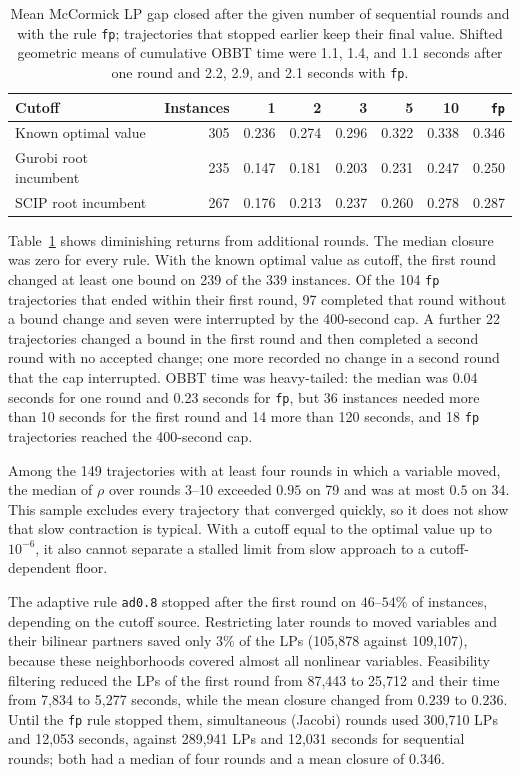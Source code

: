 \begin{table}[htbp]
\centering
\small
\begin{tabular}{@{}lrrrrrrr@{}}
\toprule
Cutoff & Instances & 1 & 2 & 3 & 5 & 10 & \texttt{fp}\\
\midrule
Known optimal value & 305 & 0.236 & 0.274 & 0.296 & 0.322 & 0.338 & 0.346\\
Gurobi root incumbent & 235 & 0.147 & 0.181 & 0.203 & 0.231 & 0.247 & 0.250\\
SCIP root incumbent & 267 & 0.176 & 0.213 & 0.237 & 0.260 & 0.278 & 0.287\\
\bottomrule
\end{tabular}
\caption{Mean McCormick LP gap closed after the given number of sequential
rounds and with the rule \texttt{fp}; trajectories that stopped earlier keep
their final value. Shifted geometric means of cumulative OBBT time were 1.1,
1.4, and 1.1 seconds after one round and 2.2, 2.9, and 2.1 seconds with
\texttt{fp}.}
\label{tab:precursor-rounds}
\end{table}

Table~\ref{tab:precursor-rounds} shows diminishing returns from additional
rounds. The median closure was zero for every rule. With the known optimal
value as cutoff, the first round changed at least one bound on 239 of the 339
instances. Of the 104 \texttt{fp} trajectories that ended within their first
round, 97 completed that round without a bound change and seven were
interrupted by the 400-second cap. A further 22 trajectories changed a bound in
the first round and then completed a second round with no accepted change; one
more recorded no change in a second round that the cap interrupted. OBBT time
was heavy-tailed: the median was 0.04 seconds for one round and 0.23 seconds for
\texttt{fp}, but 36 instances needed more than 10 seconds for the first round
and 14 more than 120 seconds, and 18 \texttt{fp} trajectories reached the
400-second cap.

Among the 149 trajectories with at least four rounds in which a variable moved,
the median of $\rho$ over rounds 3--10 exceeded $0.95$ on 79 and was at most $0.5$
on 34. This sample excludes every trajectory that converged quickly, so it does
not show that slow contraction is typical. With a cutoff equal to the optimal
value up to $10^{-6}$, it also cannot separate a stalled limit from slow
approach to a cutoff-dependent floor.

The adaptive rule \texttt{ad0.8} stopped after the first round on $46$--$54\%$
of instances, depending on the cutoff source. Restricting later rounds to moved
variables and their bilinear partners saved only $3\%$ of the LPs (105,878
against 109,107), because these neighborhoods covered almost all nonlinear
variables. Feasibility filtering reduced the LPs of the first round from 87,443
to 25,712 and their time from 7,834 to 5,277 seconds, while the mean closure
changed from $0.239$ to $0.236$. Until the \texttt{fp} rule stopped them,
simultaneous (Jacobi) rounds used 300,710 LPs and 12,053 seconds, against
289,941 LPs and 12,031 seconds for sequential rounds; both had a median of four
rounds and a mean closure of $0.346$.

